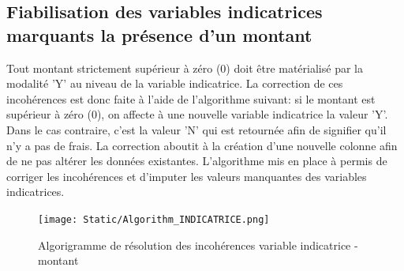 \subsection{Fiabilisation des variables indicatrices marquants la pr\'esence d'un montant}
Tout montant strictement sup\'erieur \`a z\'ero (0) doit \^etre mat\'erialis\'e par la modalit\'e 'Y' au niveau de la variable indicatrice. La correction de ces incoh\'erences est donc faite \`a l'aide de l'algorithme suivant: si le montant est sup\'erieur \`a  z\'ero (0), on affecte \`a une nouvelle variable indicatrice la valeur 'Y'. Dans le cas contraire, c'est la valeur 'N' qui est retournée afin de signifier qu'il n'y a pas de frais. La correction aboutit \`a la cr\'eation d'une nouvelle colonne afin de ne pas alt\'erer les donn\'ees existantes. L'algorithme mis en place \`a permis de corriger les incoh\'erences et d'imputer les valeurs manquantes des variables indicatrices.
\begin{figure}[H]
    \begin{center}
      \texttt{[image: Static/Algorithm\_INDICATRICE.png]} 
      \end{center}
        \caption{Algorigramme de r\'esolution des incoh\'erences variable indicatrice - montant}  \label{fig:xray}
\end{figure}

